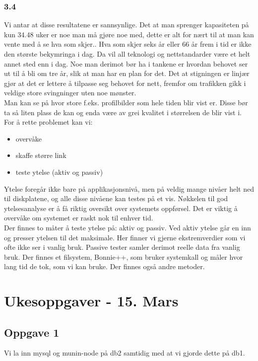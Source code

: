 \documentclass[a4paper, norsk, 12pt]{article}
\begin{document}
\subsubsection*{3.4}
Vi antar at disse resultatene er sannsynlige. Det at man sprenger kapasiteten på kun 34.48 uker er noe man må gjøre noe med, dette er alt for nært til at man kan vente med å se hva som skjer.. Hva som skjer seks år eller 66 år frem i tid er ikke den største bekymringa i dag. Da vil all teknologi og nettstandarder være et helt annet sted enn i dag. Noe man derimot bør ha i tankene er hvordan behovet ser ut til å bli om tre år, slik at man har en plan for det. Det at stigningen er linjær gjør at det er lettere å tilpasse seg behovet for nett, fremfor om trafikken gikk i veldige store svingninger uten noe mønster.\\

Man kan se på hvor store f.eks. profilbilder som hele tiden blir vist er. Disse bør ta så liten plass de kan og enda være av grei kvalitet i størrelsen de blir vist i.\\

For å rette problemet kan vi:
\begin{itemize}
\item overvåke
\item skaffe større link
\item teste ytelse (aktiv og passiv)
\end{itemize}

Ytelse foregår ikke bare på applikasjonsnivå, men på veldig mange nivåer helt ned til diskplatene, og alle disse nivåene kan testes på et vis. Nøkkelen til god ytelsesanalyse er å få riktig oversikt over systemets oppførsel. Det er viktig å overvåke om systemet er raskt nok til enhver tid.\\

Der finnes to måter å teste ytelse på: aktiv og passiv. Ved aktiv ytelse går en inn og presser ytelsen til det maksimale. Her finner vi gjerne ekstremverdier som vi ofte ikke ser i vanlig bruk. Passive tester samler derimot reelle data fra vanlig bruk. Der finnes et filsystem, Bonnie++, som bruker systemkall og måler hvor lang tid de tok, som vi kan bruke. Der finnes også andre metoder.

\section{Ukesoppgaver - 15. Mars}
\subsection{Oppgave 1}
Vi la inn mysql og munin-node på db2 samtidig med at vi gjorde dette på db1.
\end{document}
